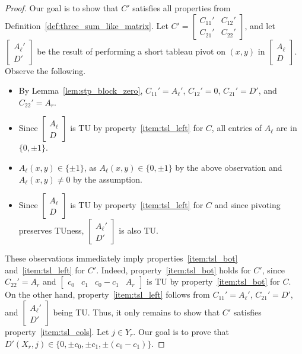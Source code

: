 \begin{proof}
    Our goal is to show that $C'$ satisfies all properties from Definition~\ref{def:three_sum_like_matrix}. Let $C' = \begin{bmatrix} C_{11}' & C_{12}' \\ C_{21}' & C_{22}' \end{bmatrix}$, and let $\begin{bmatrix} A_{\ell}' \\ D' \end{bmatrix}$ be the result of performing a short tableau pivot on $(x, y)$ in $\begin{bmatrix} A_{\ell} \\ D \end{bmatrix}$. Observe the following.

    \begin{itemize}
        \item By Lemma~\ref{lem:stp_block_zero}, $C_{11}' = A_{\ell}'$, $C_{12}' = 0$, $C_{21}' = D'$, and $C_{22}' = A_{r}$.
        \item Since $\begin{bmatrix} A_{\ell} \\ D \end{bmatrix}$ is TU by property~\ref{item:tsl_left} for $C$, all entries of $A_{\ell}$ are in $\{0, \pm 1\}$.
        \item $A_{\ell} (x, y) \in \{\pm 1\}$, as $A_{\ell} (x, y) \in \{0, \pm 1\}$ by the above observation and $A_{\ell} (x, y) \neq 0$ by the assumption.
        \item Since $\begin{bmatrix} A_{\ell} \\ D \end{bmatrix}$ is TU by property~\ref{item:tsl_left} for $C$ and since pivoting preserves TUness, $\begin{bmatrix} A_{\ell}' \\ D' \end{bmatrix}$ is also TU.
    \end{itemize}

    These observations immediately imply properties~\ref{item:tsl_bot} and~\ref{item:tsl_left} for $C'$. Indeed, property~\ref{item:tsl_bot} holds for $C'$, since $C_{22}' = A_{r}$ and $\begin{bmatrix} c_{0} & c_{1} & c_{0} - c_{1} & A_{r} \end{bmatrix}$ is TU by property~\ref{item:tsl_bot} for $C$. On the other hand, property~\ref{item:tsl_left} follows from $C_{11}' = A_{\ell}'$, $C_{21}' = D'$, and $\begin{bmatrix} A_{\ell}' \\ D' \end{bmatrix}$ being TU. Thus, it only remains to show that $C'$ satisfies property~\ref{item:tsl_cols}. Let $j \in Y_{r}$. Our goal is to prove that $D' (X_{r}, j) \in \{0, \pm c_{0}, \pm c_{1}, \pm (c_{0} - c_{1})\}$.


\end{proof}
